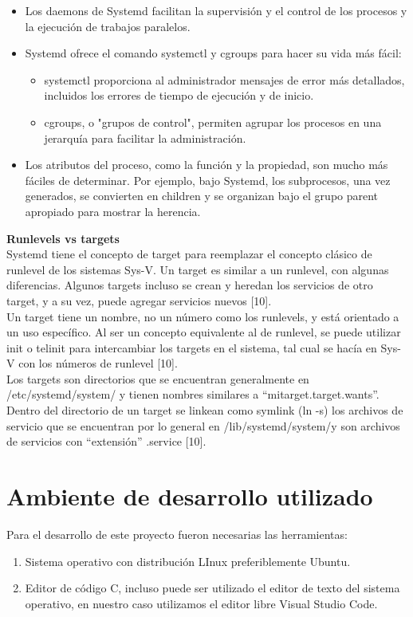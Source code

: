\documentclass[conference]{IEEEtran}
\begin{document}
\begin{itemize}
\item Los daemons de Systemd facilitan la supervisión y el control de los procesos y la ejecución de trabajos paralelos.
\item Systemd ofrece el comando systemctl y cgroups para hacer su vida más fácil:
\begin{itemize}
\item systemctl proporciona al administrador mensajes de error más detallados, incluidos los errores de tiempo de ejecución y de inicio.
\item cgroups, o "grupos de control", permiten agrupar los procesos en una jerarquía para facilitar la administración.
\end{itemize}
\item Los atributos del proceso, como la función y la propiedad, son mucho más fáciles de determinar. Por ejemplo, bajo Systemd, los subprocesos, una vez generados, se convierten en children y se organizan bajo el grupo parent apropiado para mostrar la herencia.
\end{itemize}
\textbf{Runlevels vs targets}
\\Systemd tiene el concepto de target para reemplazar el concepto clásico de runlevel de los sistemas Sys-V. Un target es similar a un runlevel, con algunas diferencias. Algunos targets incluso se crean y heredan los servicios de otro target, y a su vez, puede agregar servicios nuevos [10].
\\Un target tiene un nombre, no un número como los runlevels, y está orientado a un uso específico. Al ser un concepto equivalente al de runlevel, se puede utilizar init o telinit para intercambiar los targets en el sistema, tal cual se hacía en Sys-V con los números de runlevel [10].
\\Los targets son directorios que se encuentran generalmente en /etc/systemd/system/ y tienen nombres similares a “mitarget.target.wants”. Dentro del directorio de un target se linkean como symlink (ln -s) los archivos de servicio que se encuentran por lo general en /lib/systemd/system/y son archivos de servicios con “extensión” .service [10].


\section{Ambiente de desarrollo utilizado}
Para el desarrollo de este proyecto fueron necesarias las herramientas:
\begin{enumerate}
    \item Sistema operativo con distribución LInux preferiblemente Ubuntu.
    \item Editor de código C, incluso puede ser utilizado el editor de texto del sistema operativo, en nuestro caso utilizamos el editor libre Visual Studio Code. 
\end{enumerate}
\end{document}

